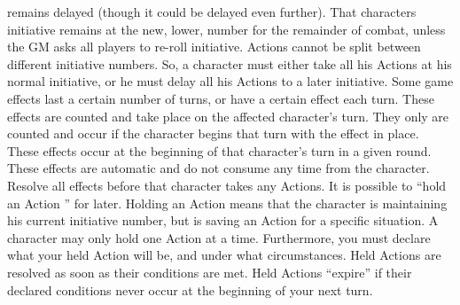 \documentclass[twoside]{book}
\begin{document}
             remains delayed (though it could be delayed even further).
             That characters initiative remains at the new, lower, number
             for the remainder of combat, unless the GM asks all players
             to re-roll initiative. Actions cannot be split between
             different initiative numbers. So, a character must either
             take all his Actions at his normal initiative, or he must
             delay all his Actions to a later initiative. 
   Some game effects last a certain number of turns, or
             have a certain effect each turn. These effects are counted
             and take place on the affected character’s turn. They
             only are counted and occur if the character begins that turn
             with the effect in place. These effects occur at the
             beginning of that character’s turn in a given round.
             These effects are automatic and do not consume any time from
             the character. Resolve all effects before that character
             takes any Actions. 
   It is possible to “hold an Action ” for
             later. Holding an Action means that the character is
             maintaining his current initiative number, but is saving an
             Action for a specific situation. A character may only hold
             one Action at a time. Furthermore, you must declare what
             your held Action will be, and under what circumstances. Held
             Actions are resolved as soon as their conditions are met.
             Held Actions “expire” if their declared
             conditions never occur at the beginning of your next turn.
             
\end{document}
